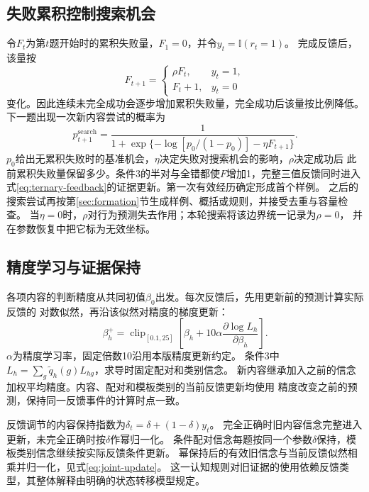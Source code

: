 \documentclass[11pt,a4paper]{article}
\numberwithin{equation}{section}
\newcommand{\ind}{\mathbb{I}}
\begin{document}
\subsection{失败累积控制搜索机会}
令$F_t$为第$t$题开始时的累积失败量，$F_1=0$，并令$y_t=\ind(r_t=1)$。
完成反馈后，该量按
\begin{equation}
F_{t+1}=\begin{cases}\rho F_t,&y_t=1,\\ F_t+1,&y_t=0\end{cases}
\label{eq:search-pressure}
\end{equation}
变化。因此连续未完全成功会逐步增加累积失败量，完全成功后该量按比例降低。
下一题出现一次新内容尝试的概率为
\begin{equation}
p^{\mathrm{search}}_{t+1}=\frac{1}{1+\exp\{-\log[p_0/(1-p_0)]-\eta F_{t+1}\}}.
\label{eq:search-probability}
\end{equation}
$p_0$给出无累积失败时的基准机会，$\eta$决定失败对搜索机会的影响，$\rho$决定成功后
此前累积失败量保留多少。条件3的半对与全错都使$F$增加1，完整三值反馈同时进入
式\eqref{eq:ternary-feedback}的证据更新。第一次有效经历确定形成首个样例。
之后的搜索尝试再按第\ref{sec:formation}节生成样例、概括或规则，并接受去重与容量检查。
当$\eta=0$时，$\rho$对行为预测失去作用；本轮搜索将该边界统一记录为$\rho=0$，
并在参数恢复中把它标为无效坐标。

\subsection{精度学习与证据保持}
各项内容的判断精度从共同初值$\beta_0$出发。每次反馈后，先用更新前的预测计算实际反馈的
对数似然，再沿该似然对精度的梯度更新：
\begin{equation}
\beta_h^+=\operatorname{clip}_{[0.1,25]}
\left[\beta_h+10\alpha\frac{\partial\log L_h}{\partial\beta_h}\right].
\label{eq:selected-precision}
\end{equation}
$\alpha$为精度学习率，固定倍数10沿用本版精度更新约定。
条件3中$L_h=\sum_g\widetilde q_h(g)L_{hg}$，求导时固定配对和类别信念。
新内容继承加入之前的信念加权平均精度。内容、配对和模板类别的当前反馈更新均使用
精度改变之前的预测，保持同一反馈事件的计算时点一致。

反馈调节的内容保持指数为$\delta_t=\delta+(1-\delta)y_t$。
完全正确时旧内容信念完整进入更新，未完全正确时按$\delta$作幂归一化。
条件配对信念每题按同一个参数$\delta$保持，模板类别信念继续按实际反馈条件更新。
幂保持后的有效旧信念与当前反馈似然相乘并归一化，见式\eqref{eq:joint-update}。
这一认知规则对旧证据的使用依赖反馈类型，其整体解释由明确的状态转移模型规定。
\end{document}

